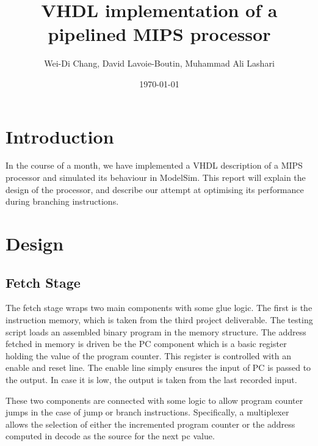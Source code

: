 \documentclass[12pt]{IEEEtran} %
\title{VHDL implementation of a pipelined MIPS processor}
\date{\today}
\author{Wei-Di Chang, David Lavoie-Boutin, Muhammad Ali Lashari}
\begin{document}

\section{Introduction} %
\label{sec:introduction}

In the course of a month, we have implemented a VHDL description of a MIPS processor and simulated its behaviour in ModelSim. This report will explain the design of the processor, and describe our attempt at optimising its performance during branching instructions. 

\section{Design} %
\label{sec:design}

\subsection{Fetch Stage} %
\label{sub:fetch_stage}
The fetch stage wraps two main components with some glue logic. The first is the instruction memory, which is taken from the third project deliverable. The testing script loads an assembled binary program in the memory structure. The address fetched in memory is driven be the PC component which is a basic register holding the value of the program counter. This register is controlled with an enable and reset line. The enable line simply ensures the input of PC is passed to the output. In case it is low, the output is taken from the last recorded input.

These two components are connected with some logic to allow program counter jumps in the case of jump or branch instructions. Specifically, a multiplexer allows the selection of either the incremented program counter or the address computed in decode as the source for the next pc value.  
\end{document}
